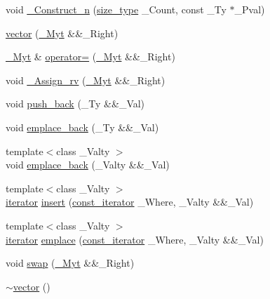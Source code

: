 \begin{DoxyCompactItemize}
\item 
void \hyperlink{classvector_a37d757eaf6d72cf8b3d0e2195cacf188}{\+\_\+\+Construct\+\_\+n} (\hyperlink{classvector_ac975e84f5d6c2fe2267bb354a85818af}{size\+\_\+type} \+\_\+\+Count, const \+\_\+\+Ty $\ast$\+\_\+\+Pval)
\item 
\hyperlink{classvector_ad6d57100eef2daafdcc4628af06a656d}{vector} (\hyperlink{classvector_ae499c665535254a7364e3a219b780112}{\+\_\+\+Myt} \&\&\+\_\+\+Right)
\item 
\hyperlink{classvector_ae499c665535254a7364e3a219b780112}{\+\_\+\+Myt} \& \hyperlink{classvector_a209c9b772cdd5ed01ffc9d351a953826}{operator=} (\hyperlink{classvector_ae499c665535254a7364e3a219b780112}{\+\_\+\+Myt} \&\&\+\_\+\+Right)
\item 
void \hyperlink{classvector_a5b3c2d0a2573a1ed31a1ac9b7413f0f3}{\+\_\+\+Assign\+\_\+rv} (\hyperlink{classvector_ae499c665535254a7364e3a219b780112}{\+\_\+\+Myt} \&\&\+\_\+\+Right)
\item 
void \hyperlink{classvector_acf11e850cea519337e771d3d9d3779eb}{push\+\_\+back} (\+\_\+\+Ty \&\&\+\_\+\+Val)
\item 
void \hyperlink{classvector_a9a698dee99d62dd092caa7f17572866a}{emplace\+\_\+back} (\+\_\+\+Ty \&\&\+\_\+\+Val)
\item 
{\footnotesize template$<$class \+\_\+\+Valty $>$ }\\void \hyperlink{classvector_abd73be05a346e182658bbc1b1ae52dec}{emplace\+\_\+back} (\+\_\+\+Valty \&\&\+\_\+\+Val)
\item 
{\footnotesize template$<$class \+\_\+\+Valty $>$ }\\\hyperlink{classvector_a5a7a542bca0f55f43e161bd5a09c483d}{iterator} \hyperlink{classvector_ac52a3ac9c41a88dea7ab11fd73539893}{insert} (\hyperlink{classvector_abed2910558c61a5a17113b2d250994da}{const\+\_\+iterator} \+\_\+\+Where, \+\_\+\+Valty \&\&\+\_\+\+Val)
\item 
{\footnotesize template$<$class \+\_\+\+Valty $>$ }\\\hyperlink{classvector_a5a7a542bca0f55f43e161bd5a09c483d}{iterator} \hyperlink{classvector_abd24d07d48fcb842a6d07d2e7f0578dc}{emplace} (\hyperlink{classvector_abed2910558c61a5a17113b2d250994da}{const\+\_\+iterator} \+\_\+\+Where, \+\_\+\+Valty \&\&\+\_\+\+Val)
\item 
void \hyperlink{classvector_a949b2559806ecaae9cd5e3fcbec75d95}{swap} (\hyperlink{classvector_ae499c665535254a7364e3a219b780112}{\+\_\+\+Myt} \&\&\+\_\+\+Right)
\item 
\hyperlink{classvector_a98318c18baf337cfd287144557edb20c}{$\sim$vector} ()

\end{DoxyCompactItemize}
